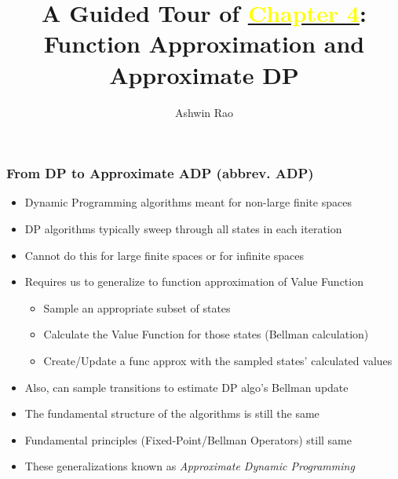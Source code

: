 \documentclass[handout]{beamer}
\title[Approximate DP Chapter]{A Guided Tour of \href{http://stanford.edu/~ashlearn/RLForFinanceBook/book.pdf}{\underline{\textcolor{yellow}{Chapter 4}}}: \\ Function Approximation and Approximate DP} %
\author{Ashwin Rao} %
\institute[Stanford] %
{ICME, Stanford University
}
\date %
\begin{document}
\lstset{language=Python}  
\begin{frame}
\titlepage %
\end{frame}


\begin{frame}
\frametitle{From DP to Approximate ADP (abbrev. ADP)}
\begin{itemize}[<+->]
\item Dynamic Programming algorithms meant for non-large finite spaces
\item DP algorithms typically sweep through all states in each iteration
\item Cannot do this for large finite spaces or for infinite spaces
\item Requires us to generalize to function approximation of Value Function
\begin{itemize}[<+->]
\item Sample an appropriate subset of states 
\item Calculate the Value Function for those states (Bellman calculation)
\item Create/Update a func approx with the sampled states' calculated values
\end{itemize}
\item Also, can sample transitions to estimate DP algo's Bellman update
\item The fundamental structure of the algorithms is still the same
\item Fundamental principles (Fixed-Point/Bellman Operators) still same
\item These generalizations known as {\em Approximate Dynamic Programming}
 \end{itemize}
\end{frame}
\end{document}

